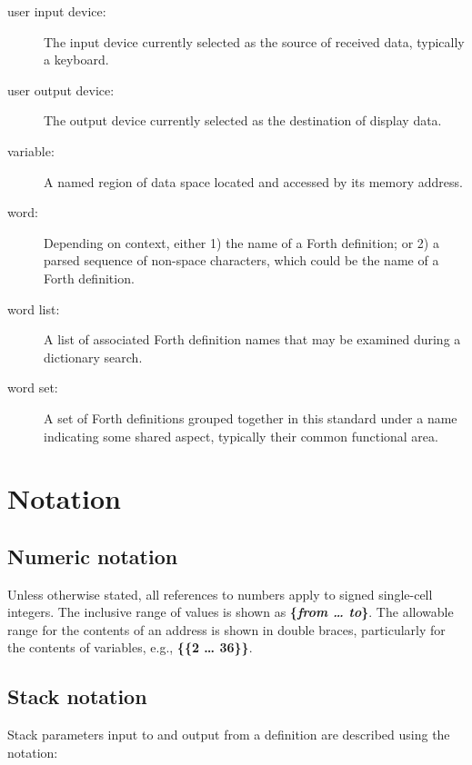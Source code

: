 \begin{description}
\item[user input device:]
	The input device currently selected as the source of received
	data, typically a keyboard.

\item[user output device:]
	The output device currently selected as the destination of
	display data.

\item[variable:]
	A named region of data space located and accessed by its memory
	address.

\item[word:]
	Depending on context, either
	1) the name of a Forth definition; or
	2) a parsed sequence of non-space characters,
	which could be the name of a Forth definition.

\item[word list:]
	A list of associated Forth definition names that may be examined
	during a dictionary search.

\item[word set:]
	A set of Forth definitions grouped together in this standard
	under a name indicating some shared aspect, typically their
	common functional area.
\end{description}

\section{Notation} %
\label{notations}

\subsection{Numeric notation}
\label{notation:numeric}

Unless otherwise stated, all references to numbers apply to signed
single-cell integers. The inclusive range of values is shown as
\textbf{\{\textit{from {\ldots} to}\}}. The allowable range for the
contents of an address is shown in double braces, particularly for
the contents of variables,
e.g.,  \textbf{\{\{2 {\ldots} 36\}\}}.


\subsection{Stack notation}

Stack parameters input to and output from a definition are described
using the notation:
\begin{quote}
\end{quote}

